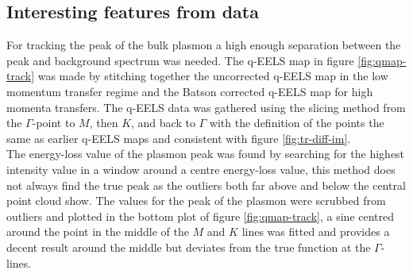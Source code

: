 \subsection{Interesting features from data}
%
For tracking the peak of the bulk plasmon a high enough separation between the peak and background spectrum was needed. The q-EELS map in figure \ref{fig:qmap-track} was made by stitching together the uncorrected q-EELS map in the low momentum transfer regime and the Batson corrected q-EELS map for high momenta transfers. The q-EELS data was gathered using the slicing method from the $\Gamma$-point to $M$, then $K$, and back to $\Gamma$ with the definition of the points the same as earlier q-EELS maps and consistent with figure \ref{fig:tr-diff-im}.\\
The energy-loss value of the plasmon peak was found by searching for the highest intensity value in a window around a centre energy-loss value, this method does not always find the true peak as the outliers both far above and below the central point cloud show. The values for the peak of the plasmon were scrubbed from outliers and plotted in the bottom plot of figure \ref{fig:qmap-track}, a sine centred around the point in the middle of the $M$ and $K$ lines was fitted and provides a decent result around the middle but deviates from the true function at the $\Gamma$-lines.\\
%
\newpage

